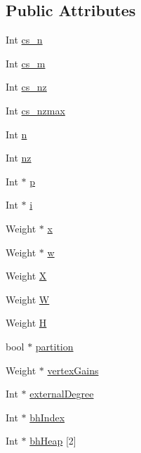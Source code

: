 \subsection*{Public Attributes}
\begin{DoxyCompactItemize}
\item 
Int \hyperlink{class_mongoose_1_1_graph_a83cb71d4acb332e402220e2899667da0}{cs\+\_\+n}
\item 
Int \hyperlink{class_mongoose_1_1_graph_a66c252163205fa7d5ca6fd50812724dd}{cs\+\_\+m}
\item 
Int \hyperlink{class_mongoose_1_1_graph_aa580ced39fb66fc39afed15d8b9a76fa}{cs\+\_\+nz}
\item 
Int \hyperlink{class_mongoose_1_1_graph_a4535d32201569d087ba13f184131cfe2}{cs\+\_\+nzmax}
\item 
Int \hyperlink{class_mongoose_1_1_graph_a93aec4ec3102b46598f64438e19e1867}{n}
\item 
Int \hyperlink{class_mongoose_1_1_graph_a4b715d25936070308d6b1286216dc3d7}{nz}
\item 
Int $\ast$ \hyperlink{class_mongoose_1_1_graph_a0f76998b739e6c44db3573714958b849}{p}
\item 
Int $\ast$ \hyperlink{class_mongoose_1_1_graph_aa8a772a57613d0a3f1fd705c45dd119d}{i}
\item 
Weight $\ast$ \hyperlink{class_mongoose_1_1_graph_a28f82cb885c3666e0d1c37a85d1b3746}{x}
\item 
Weight $\ast$ \hyperlink{class_mongoose_1_1_graph_a9fd62742d8093010fc4b680f1a68dde2}{w}
\item 
Weight \hyperlink{class_mongoose_1_1_graph_a655fedf900671a8e6fc52f9133e71106}{X}
\item 
Weight \hyperlink{class_mongoose_1_1_graph_af865ffb7d500a094501b16c4e08bf664}{W}
\item 
Weight \hyperlink{class_mongoose_1_1_graph_a12a68e1a79d1fe8de7e607e7450b4d75}{H}
\item 
bool $\ast$ \hyperlink{class_mongoose_1_1_graph_a6f77274bc866a3b61da35f7e2ceb520e}{partition}
\item 
Weight $\ast$ \hyperlink{class_mongoose_1_1_graph_acb4ab15f1abccc3532f678a09d194bdd}{vertex\+Gains}
\item 
Int $\ast$ \hyperlink{class_mongoose_1_1_graph_a60624f281d036722273fbb61c3780efa}{external\+Degree}
\item 
Int $\ast$ \hyperlink{class_mongoose_1_1_graph_af86e4a4881a318cdad331d8249f36e7a}{bh\+Index}
\item 
Int $\ast$ \hyperlink{class_mongoose_1_1_graph_a8fb629455d09b3dc44da3724aeb2dde9}{bh\+Heap} \mbox{[}2\mbox{]}

\end{DoxyCompactItemize}
